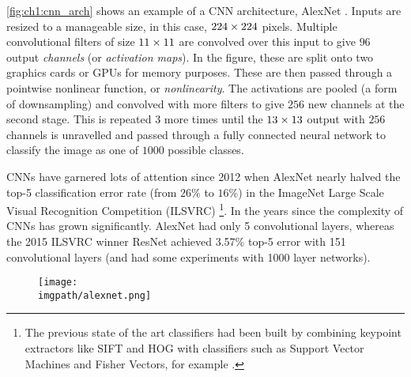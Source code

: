 \autoref{fig:ch1:cnn_arch} shows an example of a CNN
architecture, AlexNet \cite{krizhevsky_imagenet_2012}. Inputs are resized to a
manageable size, in this case, $224\times 224$ pixels. Multiple convolutional
filters of size $11\times 11$ are convolved over this input to give $96$ output
\emph{channels} (or \emph{activation maps}). In the figure, these are split onto two
graphics cards or GPUs for memory purposes. These are then passed through a
pointwise nonlinear function, or \emph{nonlinearity}.
The activations are pooled (a form of downsampling) and convolved with more
filters to give $256$ new channels at the second stage. This is repeated 3 more
times until the $13\times 13$ output with $256$ channels is unravelled and passed
through a fully connected neural network to classify the image as one of $1000$
possible classes.

CNNs have garnered lots of attention since 2012 when AlexNet
nearly halved the top-5 classification error rate (from $26\%$ to $16\%$)
in the ImageNet Large Scale Visual Recognition Competition (ILSVRC)
\cite{russakovsky_imagenet_2015}\footnote{The previous state of
the art classifiers had been built by combining keypoint extractors like
SIFT\cite{lowe_distinctive_2004} and HOG\cite{dalal_histograms_2005} with
classifiers such as Support Vector Machines\cite{cortes_support-vector_1995} and
Fisher Vectors\cite{sanchez_image_2013}, for example \cite{sanchez_high-dimensional_2011}.}.
In the years since the complexity of CNNs has grown significantly. AlexNet had
only 5 convolutional layers, whereas the 2015 ILSVRC winner ResNet \cite{he_deep_2016}
achieved 3.57\% top-5 error with 151 convolutional layers (and had some
experiments with 1000 layer networks).

\begin{figure}
  \centering
    \texttt{[image: \\imgpath/alexnet.png]}
    \label{fig:ch1:cnn_arch}
  \end{figure}


